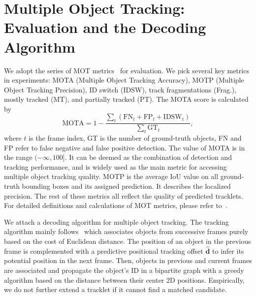 \documentclass[10pt,twocolumn,letterpaper]{article}
\begin{document}
\section{Multiple Object Tracking: Evaluation and the Decoding Algorithm}

We adopt the series of MOT metrics~\cite{milan2016mot16} for evaluation. We pick several key metrics in experiments: MOTA (Multiple Object Tracking Accuracy), MOTP (Multiple Object Tracking Precision), ID switch (IDSW), track fragmentations (Frag.), mostly tracked (MT), and partially tracked (PT). The MOTA score is calculated by
\begin{equation*}
    \text{MOTA} = 1 - \frac{\sum_t (\text{FN}_t + \text{FP}_t + \text{IDSW}_t)}{\sum_t \text{GT}_t},
\end{equation*}
where $t$ is the frame index, GT is the number of ground-truth objects, FN and FP refer to false negative and false positive detection. The value of MOTA is in the range $(-\infty, 100]$. It can be deemed as the combination of detection and tracking performance, and is widely used as the main metric for accessing multiple object tracking quality. MOTP is the average IoU value on all ground-truth bounding boxes and its assigned prediction. It describes the localized precision. The rest of these metrics all reflect the quality of predicted tracklets. For detailed definitions and calculations of MOT metrics, please refer to~\cite{milan2016mot16}.

We attach a decoding algorithm for multiple object tracking. The tracking algorithm mainly follows~\cite{zhou2020tracking} which associates objects from successive frames purely based on the cost of Euclidean distance. The position of an object in the previous frame is complemented with a predictive positional tracking offset $\hat{\textbf{d}}$ to infer its potential position in the next frame. Then, objects in previous and current frames are associated and propagate the object's ID in a bipartite graph with a greedy algorithm based on the distance between their center 2D positions. Empirically, we do not further extend a tracklet if it cannot find a matched candidate.
\end{document}
